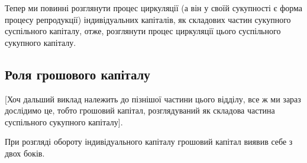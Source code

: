Тепер ми повинні розглянути процес циркуляції (а він у своїй сукупності
є форма процесу репродукції) індивідуальних капіталів, як складових
частин сукупного суспільного капіталу, отже, розглянути процес
циркуляції цього суспільного сукупного капіталу.

\subsection{Роля грошового капіталу}

[Хоч дальший виклад належить до пізнішої частини цього відділу,
все ж ми зараз дослідимо це, тобто грошовий капітал, розглядуваний
як складова частина суспільного сукупного капіталу].

При розгляді обороту індивідуального капіталу грошовий капітал виявив
себе з двох боків.
